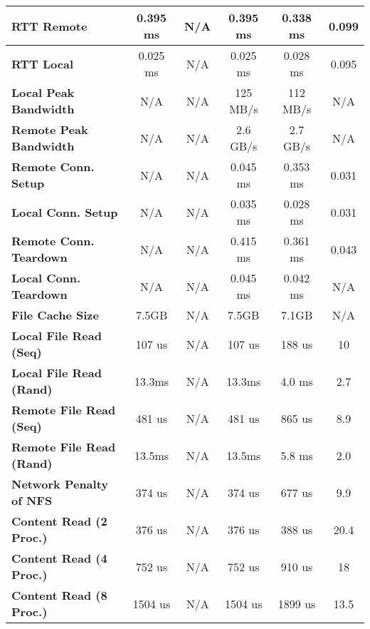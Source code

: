 \begin{table}[ht]
\begin{threeparttable}
\begin{tabular}{lccccc}
  \hline
  \textbf{RTT Remote}  & 0.395 ms  & N/A & 0.395 ms & 0.338 ms & 0.099 \\
  \hline
  \textbf{RTT Local}  & 0.025 ms & N/A & 0.025 ms & 0.028 ms & 0.095 \\
  \hline
  \textbf{Local Peak Bandwidth}  & N/A & N/A & 125 MB/s & 112 MB/s & N/A\\
  \hline
  \textbf{Remote Peak Bandwidth} & N/A & N/A & 2.6 GB/s & 2.7 GB/s & N/A \\
  \hline
  \textbf{Remote Conn. Setup}  & N/A & N/A & 0.045 ms & 0.353 ms & 0.031 \\
  \hline
  \textbf{Local Conn. Setup}  & N/A & N/A & 0.035 ms & 0.028 ms & 0.031 \\
  \hline
  \textbf{Remote Conn. Teardown}  & N/A & N/A & 0.415 ms & 0.361 ms & 0.043 \\
  \hline
  \textbf{Local Conn. Teardown}  & N/A & N/A & 0.045 ms & 0.042 ms & N/A \\
  \hline
  \textbf{File Cache Size} & 7.5GB & N/A & 7.5GB & 7.1GB & N/A \\
  \hline
  \textbf{Local File Read (Seq)} & 107 us & N/A & 107 us & 188 us & 10 \\
  \hline
  \textbf{Local File Read (Rand)} & 13.3ms & N/A & 13.3ms & 4.0 ms & 2.7\\
  \hline
  \textbf{Remote File Read (Seq)} & 481 us & N/A & 481 us & 865 us & 8.9 \\
  \hline
  \textbf{Remote File Read (Rand)} & 13.5ms & N/A & 13.5ms & 5.8 ms & 2.0\\
  \hline
  \textbf{Network Penalty of NFS} & 374 us & N/A & 374 us & 677 us & 9.9 \\
  \hline
  \textbf{Content Read (2 Proc.)} & 376 us & N/A & 376 us & 388 us & 20.4 \\
  \hline
  \textbf{Content Read (4 Proc.)} & 752 us & N/A & 752 us & 910 us & 18 \\
  \hline
  \textbf{Content Read (8 Proc.)} & 1504 us & N/A & 1504 us & 1899 us & 13.5\\

  \hline
  \end{tabular}
  \end{threeparttable}
  \label{Summary_Table}
\end{table}
